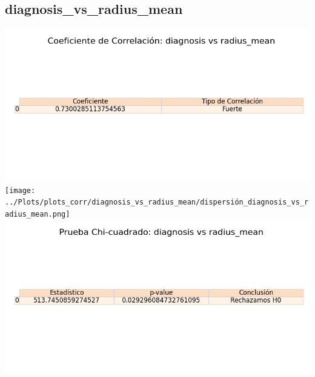 \documentclass[a4paper, 12pt]{article}
\begin{document}
\subsection{diagnosis\_vs\_radius\_mean}
    \includegraphics[width = \textwidth]{../Plots/plots_corr/diagnosis_vs_radius_mean/coeficiente_correlacion_diagnosis_vs_radius_mean.png}
    \texttt{[image: ../Plots/plots\_corr/diagnosis\_vs\_radius\_mean/dispersión\_diagnosis\_vs\_radius\_mean.png]}
    \includegraphics[width = \textwidth]{../Plots/plots_corr/diagnosis_vs_radius_mean/chi_cuadrado_diagnosis_vs_radius_mean.png}
\end{document}
